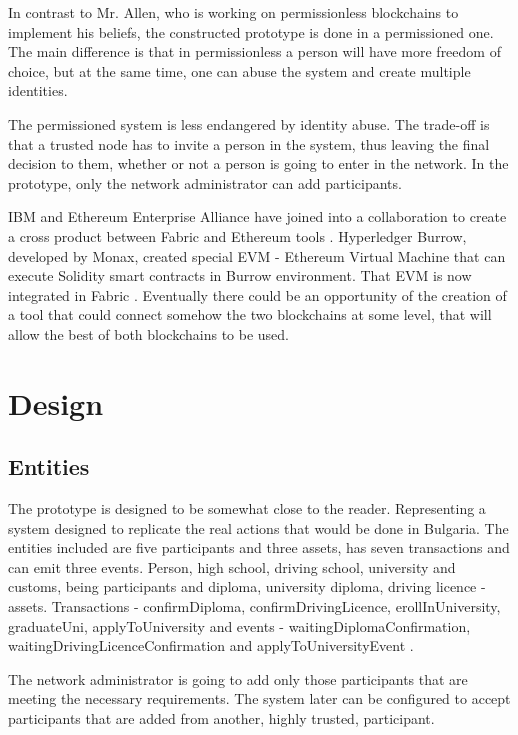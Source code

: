 \documentclass[a4paper,11pt]{report}
\begin{document}
In contrast to Mr. Allen, who is working on permissionless blockchains to implement his beliefs, the constructed prototype is done in a permissioned one. The main difference is that in permissionless a person will have more freedom of choice, but at the same time, one can abuse the system and create multiple identities. 

The permissioned system is less endangered by identity abuse. The trade-off is that a trusted node has to invite a person in the system, thus leaving the final decision to them, whether or not a person is going to enter in the network. In the prototype, only the network administrator can add participants.

IBM and Ethereum Enterprise Alliance have joined into a collaboration to create a cross product between Fabric and Ethereum tools \cite{joinforces}. Hyperledger Burrow, developed by Monax, created special EVM - Ethereum Virtual Machine that can execute Solidity smart contracts in Burrow environment. That EVM is now integrated in Fabric \cite{evmInFabric}. Eventually there could be an opportunity of the creation of a tool that could connect somehow the two blockchains at some level, that will allow the best of both blockchains to be used.


\section{Design}

\subsection{Entities}


The prototype is designed to be somewhat close to the reader. Representing a system designed to replicate the real actions that would be done in Bulgaria. The entities included are five participants and three assets, has seven transactions and can emit three events. Person, high school, driving school, university and customs, being participants and diploma, university diploma, driving licence - assets. Transactions - confirmDiploma, confirmDrivingLicence, erollInUniversity, graduateUni, applyToUniversity and events - waitingDiplomaConfirmation, waitingDrivingLicenceConfirmation and applyToUniversityEvent . 

The network administrator is going to add only those participants that are meeting the necessary requirements. The system later can be configured to accept participants that are added from another, highly trusted, participant.  
\end{document}
